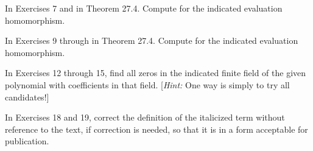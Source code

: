 \documentclass[11pt,oneside]{article}
\begin{document}
\BookNarrativefalse

\begin{BookBody}

\noindent In Exercises 7 and  in Theorem 27.4. Compute for the indicated evaluation homomorphism.



\noindent In Exercises 9 through  in Theorem 27.4. Compute for the indicated evaluation homomorphism.




\noindent In Exercises 12 through 15, find all zeros in the indicated finite field of the given polynomial with coefficients in that field. [\textit{Hint:} One way is simply to try all candidates!]








\noindent In Exercises 18 and 19, correct the definition of the italicized term without reference to the text, if correction is needed, so that it is in a form acceptable for publication.


\end{BookBody}
\end{document}
